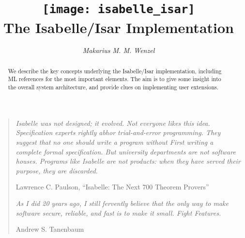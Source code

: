 \documentclass[12pt,a4paper,fleqn]{report}
\title{\texttt{[image: isabelle\_isar]}
  \\[4ex] The Isabelle/Isar Implementation}
\author{\emph{Makarius M. M. Wenzel}}
\begin{document}
\maketitle 

\begin{abstract}
  We describe the key concepts underlying the Isabelle/Isar
  implementation, including ML references for the most important
  elements.  The aim is to give some insight into the overall system
  architecture, and provide clues on implementing user extensions.
\end{abstract}

\vspace*{2.5cm}
\begin{quote}
  
  {\small\em Isabelle was not designed; it evolved.  Not everyone
    likes this idea.  Specification experts rightly abhor
    trial-and-error programming.  They suggest that no one should
    write a program without First writing a complete formal
    specification. But university departments are not software houses.
    Programs like Isabelle are not products: when they have served
    their purpose, they are discarded.}
  
  Lawrence C. Paulson, ``Isabelle: The Next 700 Theorem Provers''

  \vspace*{1cm}
  
  {\small\em As I did 20 years ago, I still fervently believe that the
    only way to make software secure, reliable, and fast is to make it
    small.  Fight Features.}
  
  Andrew S. Tanenbaum

\end{quote}

\thispagestyle{empty}\clearpage

 \tableofcontents \clearfirst









\appendix


\begingroup
\tocentry{\bibname}
 \small\raggedright\frenchspacing

\endgroup

\tocentry{\glossaryname}
\printglossary

\tocentry{\indexname}
\printindex
\end{document}
